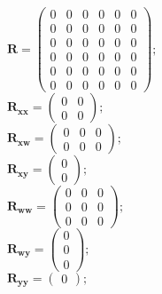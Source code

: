 \documentclass[11pt, oneside]{article}      %
\begin{document}
%
$ \mathbf{R} = \left(\begin{array}{cccccc}0 & 0 & 0 & 0 & 0 & 0\\0 & 0 & 0 & 0 & 0 & 0\\0 & 0 & 0 & 0 & 0 & 0\\0 & 0 & 0 & 0 & 0 & 0\\0 & 0 & 0 & 0 & 0 & 0\\0 & 0 & 0 & 0 & 0 & 0\end{array}\right) ; $ 
%
\\
%
$ \mathbf{R_{xx}} = \left(\begin{array}{cc}0 & 0\\0 & 0\end{array}\right) ; $ 
%
\\
%
$ \mathbf{R_{xw}} = \left(\begin{array}{ccc}0 & 0 & 0\\0 & 0 & 0\end{array}\right) ; $ 
%
\\
%
$ \mathbf{R_{xy}} = \left(\begin{array}{c}0\\0\end{array}\right) ; $ 
%
\\
%
$ \mathbf{R_{ww}} = \left(\begin{array}{ccc}0 & 0 & 0\\0 & 0 & 0\\0 & 0 & 0\end{array}\right) ; $ 
%
\\
%
$ \mathbf{R_{wy}} = \left(\begin{array}{c}0\\0\\0\end{array}\right) ; $ 
%
\\
%
$ \mathbf{R_{yy}} = \left(\begin{array}{c}0\end{array}\right) ; $ 
%
\\
%
\end{document}
